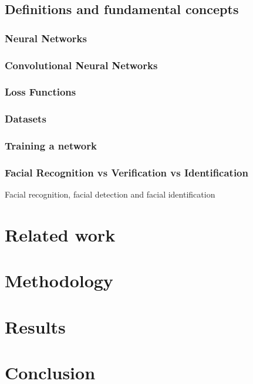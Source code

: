 \documentclass[a4paper, 12pt]{report}
\begin{document}




\newpage
\section{Definitions and fundamental concepts}
\subsection{Neural Networks}
\subsection{Convolutional Neural Networks}
\subsection{Loss Functions}
\subsection{Datasets}
\subsection{Training a network}
\subsection{Facial Recognition vs Verification vs Identification}
Facial recognition, facial detection and facial identification





\chapter{Related work}
\newpage

\chapter{Methodology}
\newpage

\chapter{Results}
\newpage

\chapter{Conclusion}

\newpage
\printbibliography
\end{document}
